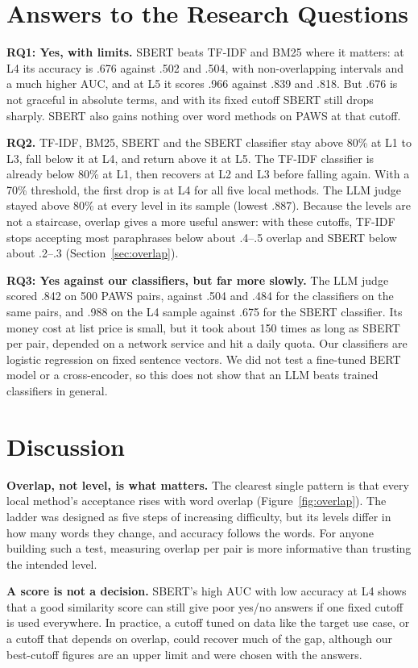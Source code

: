 \documentclass[11pt]{article}
\begin{document}
\section{Answers to the Research Questions}
\textbf{RQ1: Yes, with limits.} SBERT beats TF-IDF and BM25 where it matters: at L4 its accuracy is .676 against .502 and .504, with non-overlapping intervals and a much higher AUC, and at L5 it scores .966 against .839 and .818. But .676 is not graceful in absolute terms, and with its fixed cutoff SBERT still drops sharply. SBERT also gains nothing over word methods on PAWS at that cutoff.

\textbf{RQ2.} TF-IDF, BM25, SBERT and the SBERT classifier stay above 80\% at L1 to L3, fall below it at L4, and return above it at L5. The TF-IDF classifier is already below 80\% at L1, then recovers at L2 and L3 before falling again. With a 70\% threshold, the first drop is at L4 for all five local methods. The LLM judge stayed above 80\% at every level in its sample (lowest .887). Because the levels are not a staircase, overlap gives a more useful answer: with these cutoffs, TF-IDF stops accepting most paraphrases below about .4--.5 overlap and SBERT below about .2--.3 (Section~\ref{sec:overlap}).

\textbf{RQ3: Yes against our classifiers, but far more slowly.} The LLM judge scored .842 on 500 PAWS pairs, against .504 and .484 for the classifiers on the same pairs, and .988 on the L4 sample against .675 for the SBERT classifier. Its money cost at list price is small, but it took about 150 times as long as SBERT per pair, depended on a network service and hit a daily quota. Our classifiers are logistic regression on fixed sentence vectors. We did not test a fine-tuned BERT model or a cross-encoder, so this does not show that an LLM beats trained classifiers in general.

\section{Discussion}
\textbf{Overlap, not level, is what matters.} The clearest single pattern is that every local method's acceptance rises with word overlap (Figure~\ref{fig:overlap}). The ladder was designed as five steps of increasing difficulty, but its levels differ in how many words they change, and accuracy follows the words. For anyone building such a test, measuring overlap per pair is more informative than trusting the intended level.

\textbf{A score is not a decision.} SBERT's high AUC with low accuracy at L4 shows that a good similarity score can still give poor yes/no answers if one fixed cutoff is used everywhere. In practice, a cutoff tuned on data like the target use case, or a cutoff that depends on overlap, could recover much of the gap, although our best-cutoff figures are an upper limit and were chosen with the answers.
\end{document}
